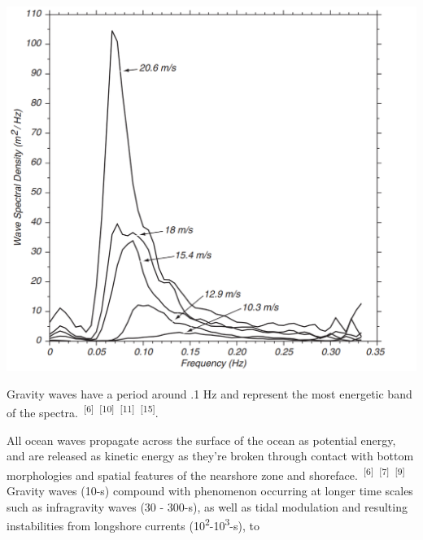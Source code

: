 \documentclass{article}
\begin{document}
\begin{minipage}[t]{0.45\textwidth}

    \vspace{0pt}
    
    \includegraphics[width=1\linewidth]{images/developed-sea-power-spectrum.png}
    \label{figure3}
    
    \vspace{.1cm}
    
    \par{\noindent Gravity waves have a period around .1 Hz and represent the most energetic band of the spectra.~\textsuperscript{[6]}~\textsuperscript{[10]}~\textsuperscript{[11]}~\textsuperscript{[15]}.}
    
    \par{\hspace{0.5cm}All ocean waves propagate across the surface of the ocean as potential energy, and are released as kinetic energy as they're broken through contact with bottom morphologies and spatial features of the nearshore zone and shoreface.~\textsuperscript{[6]}~\textsuperscript{[7]}~\textsuperscript{[9]} Gravity waves (10-s) compound with phenomenon occurring at longer time scales such as infragravity waves (30 - 300-s), as well as tidal modulation and resulting instabilities from longshore currents (10\textsuperscript{2}-10\textsuperscript{3}-s), to}
    
\end{minipage}
\end{document}
